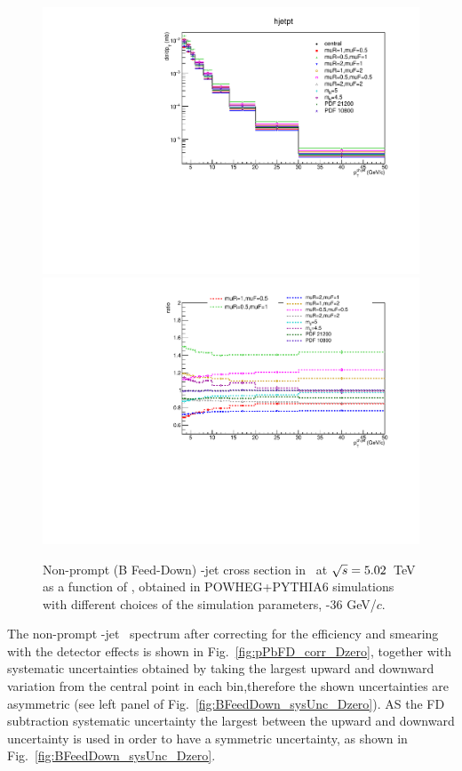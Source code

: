 \begin{figure}[bth]
\begin{center}
\includegraphics[width=.45\textwidth]{pPbcuts_2sig/feed_down/NonPromptspectra_JetPt_Dpt3_36_effScaled.pdf}
\includegraphics[width=.45\textwidth]{pPbcuts_2sig/feed_down/NonPromptspectra_JetPt_Dpt3_36_effScaled_ratio.pdf}
\caption{Non-prompt (B Feed-Down) \Dzero-jet cross section in \pp\ at $\sqrt{s}=5.02$~TeV as a function of \ptchjet, obtained in POWHEG+PYTHIA6 simulations with different choices of the simulation parameters, \ptd{}-36 GeV/$c$.} 
\label{fig:BFeedDown_JetPtSpectrum_Dzero}
\end{center}
\end{figure}

The non-prompt \Dzero-jet \pt\ spectrum after correcting for the efficiency and smearing with the detector effects is shown in Fig.~\ref{fig:pPbFD_corr_Dzero}, together with systematic uncertainties obtained by taking the largest upward and downward variation from the central point in each bin,therefore the shown uncertainties are asymmetric (see left panel of Fig.~\ref{fig:BFeedDown_sysUnc_Dzero}). AS the FD subtraction systematic uncertainty the largest between the upward and downward uncertainty is used in order to have a symmetric uncertainty, as shown in Fig.~\ref{fig:BFeedDown_sysUnc_Dzero}.

